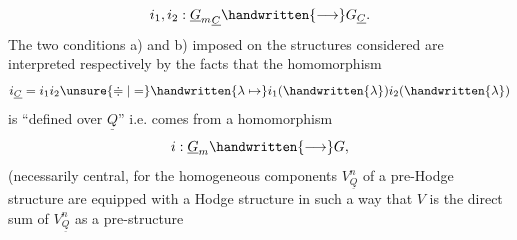 \[
i_1,i_2:{\underline{G}_m}_{\underline{C}}\handwritten{\longrightarrow}G_{\underline{C}}.
\]
The two conditions a) and b) imposed on the structures considered are interpreted respectively by the facts that the homomorphism
\[
i_{\underline{C}}=i_1i_2\unsure{\doteqdot|=}\handwritten{\lambda\mapsto}i_1(\handwritten{\lambda})i_2(\handwritten{\lambda})
\]
is ``defined over $\underline{Q}$'' i.e. comes from a homomorphism
\[
i:\underline{G}_m\handwritten{\longrightarrow}G,
\]
(necessarily central, for the homogeneous components $V_{\underline{Q}}^n$ of a pre-Hodge structure are  equipped with a Hodge structure in such a way that $V$ is the direct sum of $V_{\underline{Q}}^n$ as a pre-structure
